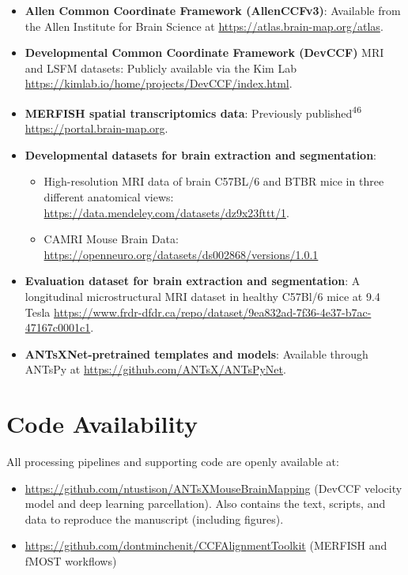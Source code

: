 \documentclass[
  12pt,
]{article}
\providecommand{\tightlist}{%
  \setlength{\itemsep}{0pt}\setlength{\parskip}{0pt}}
\begin{document}
\begin{itemize}
\tightlist
\item
  \textbf{Allen Common Coordinate Framework (AllenCCFv3)}: Available
  from the Allen Institute for Brain Science at
  \url{https://atlas.brain-map.org/atlas}.
\item
  \textbf{Developmental Common Coordinate Framework (DevCCF)} MRI and
  LSFM datasets: Publicly available via the Kim Lab
  \url{https://kimlab.io/home/projects/DevCCF/index.html}.
\item
  \textbf{MERFISH spatial transcriptomics data}: Previously
  published\textsuperscript{46} \url{https://portal.brain-map.org}.
\item
  \textbf{Developmental datasets for brain extraction and segmentation}:

  \begin{itemize}
  \tightlist
  \item
    High-resolution MRI data of brain C57BL/6 and BTBR mice in three
    different anatomical views:
    \url{https://data.mendeley.com/datasets/dz9x23fttt/1}.
  \item
    CAMRI Mouse Brain Data:
    \url{https://openneuro.org/datasets/ds002868/versions/1.0.1}
  \end{itemize}
\item
  \textbf{Evaluation dataset for brain extraction and segmentation}: A
  longitudinal microstructural MRI dataset in healthy C57Bl/6 mice at
  9.4 Tesla
  \url{https://www.frdr-dfdr.ca/repo/dataset/9ea832ad-7f36-4e37-b7ac-47167c0001c1}.
\item
  \textbf{ANTsXNet-pretrained templates and models}: Available through
  ANTsPy at
  \href{https://github.com/ANTsX/ANTsXNet}{https://github.com/ANTsX/ANTsPyNet}.
\end{itemize}

\clearpage

\section*{Code Availability}\label{code-availability}

All processing pipelines and supporting code are openly available at:

\begin{itemize}
\tightlist
\item
  \url{https://github.com/ntustison/ANTsXMouseBrainMapping} (DevCCF
  velocity model and deep learning parcellation). Also contains the
  text, scripts, and data to reproduce the manuscript (including
  figures).
\item
  \url{https://github.com/dontminchenit/CCFAlignmentToolkit} (MERFISH
  and fMOST workflows)
\end{itemize}
\end{document}
